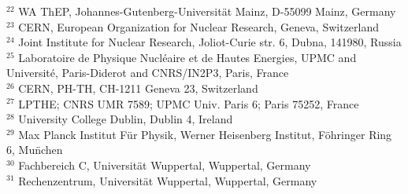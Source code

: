 { $ ^{22}$ WA ThEP, Johannes-Gutenberg-Universit\" at Mainz, D-55099 Mainz, Germany \\
 $ ^{23}$ CERN, European Organization for Nuclear Research, Geneva, Switzerland \\
 $ ^{24}$ Joint Institute for Nuclear Research, Joliot-Curie str. 6, Dubna, 141980, Russia \\ 
 $ ^{25}$ Laboratoire de Physique Nucl\' eaire et de Hautes Energies, UPMC and Universit\'e, Paris-Diderot and CNRS/IN2P3, Paris, France \\
 $ ^{26}$ CERN, PH-TH, CH-1211 Geneva 23, Switzerland \\
 $ ^{27}$ LPTHE; CNRS UMR 7589; UPMC Univ. Paris 6; Paris 75252, France \\
 $ ^{28}$ University College Dublin, Dublin 4, Ireland \\
 $ ^{29}$ Max Planck Institut F\"ur Physik, Werner Heisenberg Institut, F\"ohringer Ring 6, Mu\"nchen \\
 $ ^{30}$ Fachbereich C, Universit\"at Wuppertal, Wuppertal, Germany \\
 $ ^{31}$ Rechenzentrum, Universit\"at Wuppertal, Wuppertal, Germany \\
}
%
